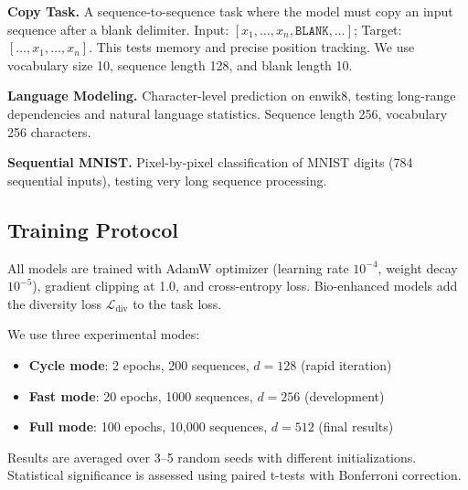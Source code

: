 \textbf{Copy Task.} A sequence-to-sequence task where the model must copy an input sequence after a blank delimiter. Input: $[x_1, \ldots, x_n, \texttt{BLANK}, \ldots]$; Target: $[\ldots, x_1, \ldots, x_n]$. This tests memory and precise position tracking. We use vocabulary size 10, sequence length 128, and blank length 10.

\textbf{Language Modeling.} Character-level prediction on enwik8, testing long-range dependencies and natural language statistics. Sequence length 256, vocabulary 256 characters.

\textbf{Sequential MNIST.} Pixel-by-pixel classification of MNIST digits (784 sequential inputs), testing very long sequence processing.

\subsection{Training Protocol}

All models are trained with AdamW optimizer (learning rate $10^{-4}$, weight decay $10^{-5}$), gradient clipping at 1.0, and cross-entropy loss. Bio-enhanced models add the diversity loss $\mathcal{L}_{\text{div}}$ to the task loss.

We use three experimental modes:
\begin{itemize}
\item \textbf{Cycle mode}: 2 epochs, 200 sequences, $d=128$ (rapid iteration)
\item \textbf{Fast mode}: 20 epochs, 1000 sequences, $d=256$ (development)
\item \textbf{Full mode}: 100 epochs, 10,000 sequences, $d=512$ (final results)
\end{itemize}

Results are averaged over 3--5 random seeds with different initializations. Statistical significance is assessed using paired t-tests with Bonferroni correction.

